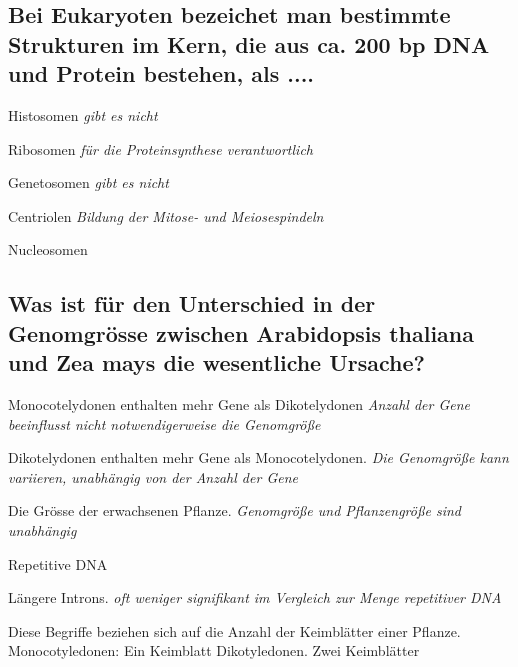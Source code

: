 \documentclass{article}
\newcommand{\cmark}{\ding{51}}%
\newcommand{\done}{\rlap{$\square$}{\raisebox{2pt}{\large\hspace{1pt}\cmark}}%
\hspace{-2.5pt}}
\newcommand{\maybe}{\rlap{($\square$)}{(\raisebox{2pt}{\large\hspace{1pt}\cmark}}%
\hspace{-2.5pt}}
\begin{document}
\subsection*{Bei Eukaryoten bezeichet man bestimmte Strukturen im Kern, die aus ca.
200 bp DNA und Protein bestehen, als ....}
\begin{todolist}%
\item Histosomen \textit{\scriptsize gibt es nicht }
\item Ribosomen \textit{\scriptsize für die Proteinsynthese verantwortlich}
\item Genetosomen \textit{\scriptsize gibt es nicht}
\item Centriolen \textit{\scriptsize Bildung der Mitose- und Meiosespindeln}
\item[\done] Nucleosomen
\end{todolist}
 
\subsection*{Was ist für den Unterschied in der Genomgrösse zwischen Arabidopsis
thaliana und Zea mays die wesentliche Ursache?}

\begin{todolist}%
\item Monocotelydonen enthalten mehr Gene als Dikotelydonen \textit{\scriptsize Anzahl der Gene beeinflusst nicht notwendigerweise die Genomgröße}
\item Dikotelydonen enthalten mehr Gene als Monocotelydonen. \textit{\scriptsize Die Genomgröße kann variieren, unabhängig von der Anzahl der Gene}
\item Die Grösse der erwachsenen Pflanze. \textit{\scriptsize Genomgröße und Pflanzengröße sind unabhängig}
\item[\done] Repetitive DNA
\item[\maybe] Längere Introns. \textit{\scriptsize oft weniger signifikant im Vergleich zur Menge repetitiver DNA}
\end{todolist}
\begin{mybox}[title={Monocotelydonen und Dikotelydonen}]
Diese Begriffe beziehen sich auf die Anzahl der Keimblätter einer Pflanze. \newline
Monocotyledonen: Ein Keimblatt \newline
Dikotyledonen. Zwei Keimblätter
\end{mybox}
\end{document}
